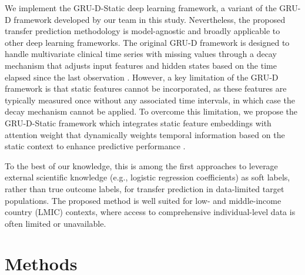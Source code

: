 \documentclass[fleqn,10pt]{wlscirep}
\begin{document}
We implement the GRU-D-Static deep learning framework, a variant of the GRU-D framework developed by our team in this study. Nevertheless, the proposed transfer prediction methodology is model-agnostic and broadly applicable to other deep learning frameworks. The original GRU-D framework is designed to handle multivariate clinical time series with missing values through a decay mechanism that adjusts input features and hidden states based on the time elapsed since the last observation \cite{che2018recurrent}. However, a key limitation of the GRU-D framework is that static features cannot be incorporated, as these features are typically measured once without any associated time intervals, in which case the decay mechanism cannot be applied. To overcome this limitation, we propose the GRU-D-Static framework which integrates static feature embeddings with attention weight that dynamically weights temporal information based on the static context to enhance predictive performance \cite{shickel2022multi}.

To the best of our knowledge, this is among the first approaches to leverage external scientific knowledge (e.g., logistic regression coefficients) as soft labels, rather than true outcome labels, for transfer prediction in data-limited target populations. The proposed method is well suited for low- and middle-income country (LMIC) contexts, where access to comprehensive individual-level data is often limited or unavailable.

\section*{Methods}
\end{document}
